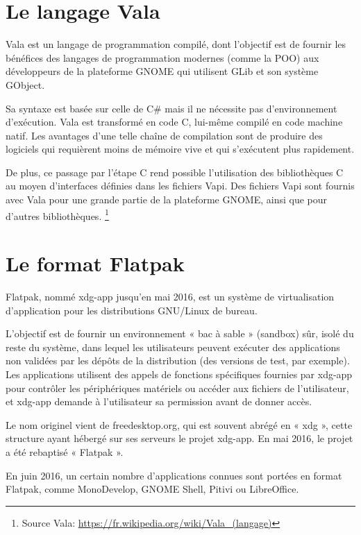 \documentclass[12pt]{report}
\begin{document}
\section{Le langage Vala}
Vala est un langage de programmation compilé, dont l'objectif est de
fournir les bénéfices des langages de programmation modernes (comme la
POO) aux développeurs de la plateforme GNOME qui utilisent GLib et son
système GObject.

Sa syntaxe est basée sur celle de C\# mais il ne nécessite pas
d'environnement d'exécution. Vala est transformé en code C, lui-même
compilé en code machine natif. Les avantages d'une telle chaîne de
compilation sont de produire des logiciels qui requièrent moins de
mémoire vive et qui s'exécutent plus rapidement.

De plus, ce passage par l'étape C rend possible l'utilisation des
bibliothèques C au moyen d'interfaces définies dans les fichiers
Vapi. Des fichiers Vapi sont fournis avec Vala pour une grande partie
de la plateforme GNOME, ainsi que pour d'autres bibliothèques.
\footnote{Source Vala: \url{https://fr.wikipedia.org/wiki/Vala_(langage)}}

\section{Le format Flatpak}
Flatpak, nommé xdg-app jusqu’en mai 2016, est un système de
virtualisation d’application pour les distributions GNU/Linux de
bureau.

L'objectif est de fournir un environnement « bac à sable » (sandbox)
sûr, isolé du reste du système, dans lequel les utilisateurs peuvent
exécuter des applications non validées par les dépôts de la
distribution (des versions de test, par exemple). Les applications
utilisent des appels de fonctions spécifiques fournies par xdg-app
pour contrôler les périphériques matériels ou accéder aux fichiers de
l'utilisateur, et xdg-app demande à l'utilisateur sa permission avant
de donner accès.

Le nom originel vient de freedesktop.org, qui est souvent abrégé en «
xdg », cette structure ayant hébergé sur ses serveurs le projet
xdg-app. En mai 2016, le projet a été rebaptisé « Flatpak ».

En juin 2016, un certain nombre d'applications connues sont portées en
format Flatpak, comme MonoDevelop, GNOME Shell, Pitivi ou LibreOffice.
\end{document}
